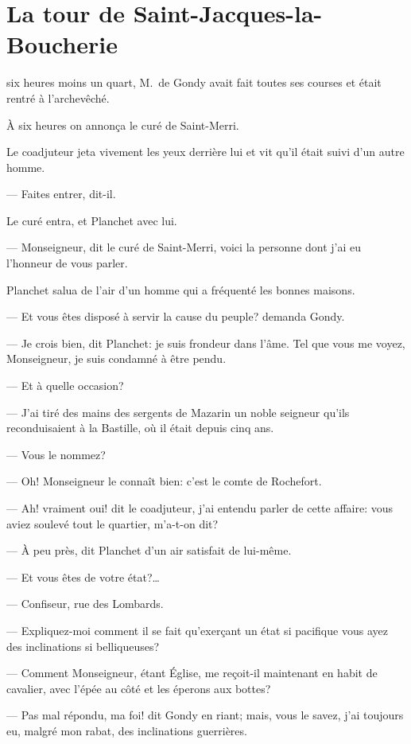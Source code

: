 \chapter{La tour de Saint-Jacques-la-Boucherie}

\lettrine{}{} six heures moins un quart, M.~de Gondy avait fait toutes ses courses et était rentré à l'archevêché.

\zz
À six heures on annonça le curé de Saint-Merri.

\zz
Le coadjuteur jeta vivement les yeux derrière lui et vit qu'il était suivi d'un autre homme.

— Faites entrer, dit-il.

Le curé entra, et Planchet avec lui.

— Monseigneur, dit le curé de Saint-Merri, voici la personne dont j'ai eu l'honneur de vous parler.

Planchet salua de l'air d'un homme qui a fréquenté les bonnes maisons.

— Et vous êtes disposé à servir la cause du peuple? demanda Gondy.

— Je crois bien, dit Planchet: je suis frondeur dans l'âme. Tel que vous me voyez, Monseigneur, je suis condamné à être pendu.

— Et à quelle occasion?

— J'ai tiré des mains des sergents de Mazarin un noble seigneur qu'ils reconduisaient à la Bastille, où il était depuis cinq ans.

— Vous le nommez?

— Oh! Monseigneur le connaît bien: c'est le comte de Rochefort.

— Ah! vraiment oui! dit le coadjuteur, j'ai entendu parler de cette affaire: vous aviez soulevé tout le quartier, m'a-t-on dit?

— À peu près, dit Planchet d'un air satisfait de lui-même.

— Et vous êtes de votre état?\dots

— Confiseur, rue des Lombards.

— Expliquez-moi comment il se fait qu'exerçant un état si pacifique vous ayez des inclinations si belliqueuses?

— Comment Monseigneur, étant Église, me reçoit-il maintenant en habit de cavalier, avec l'épée au côté et les éperons aux bottes?

— Pas mal répondu, ma foi! dit Gondy en riant; mais, vous le savez, j'ai toujours eu, malgré mon rabat, des inclinations guerrières.

